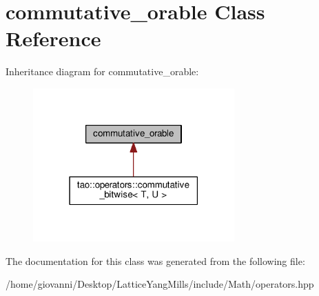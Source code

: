 \hypertarget{classcommutative__orable}{}\section{commutative\+\_\+orable Class Reference}
\label{classcommutative__orable}


Inheritance diagram for commutative\+\_\+orable\+:\nopagebreak
\begin{figure}[H]
\begin{center}
\leavevmode
\includegraphics[width=219pt]{classcommutative__orable__inherit__graph}
\end{center}
\end{figure}


The documentation for this class was generated from the following file\+:\begin{DoxyCompactItemize}
\item 
/home/giovanni/\+Desktop/\+Lattice\+Yang\+Mills/include/\+Math/operators.\+hpp\end{DoxyCompactItemize}
